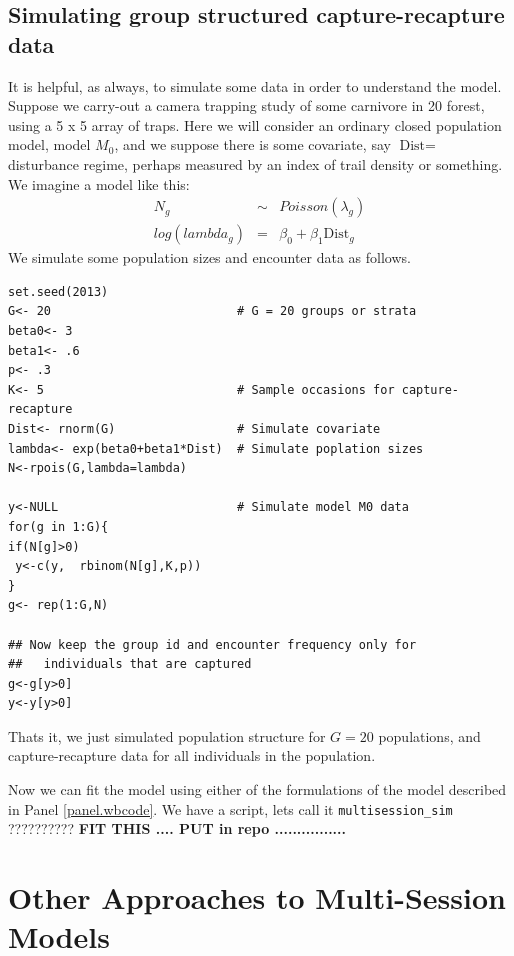 \subsection{
Simulating group structured 
capture-recapture data
}

It is helpful, as always, to simulate some data in order to understand
the model. Suppose we carry-out a camera trapping study of some
carnivore in 20 forest, using a 5 x 5 array of traps. Here we will
consider an ordinary closed population model, model $M_0$, and we
suppose there is 
some covariate, say $\mbox{Dist} = $ disturbance regime, perhaps measured by an
index of trail density or something.
We imagine a model like this:
\begin{eqnarray*}
N_{g} &\sim& Poisson(\lambda_{g})  \\
log(lambda_{g})& = &\beta_{0} + \beta_{1} \mbox{Dist}_{g} 
\end{eqnarray*}
We simulate some population sizes and encounter data  as
follows.
\begin{verbatim}
set.seed(2013)
G<- 20                          # G = 20 groups or strata
beta0<- 3
beta1<- .6
p<- .3
K<- 5                           # Sample occasions for capture-recapture
Dist<- rnorm(G)                 # Simulate covariate
lambda<- exp(beta0+beta1*Dist)  # Simulate poplation sizes 
N<-rpois(G,lambda=lambda)

y<-NULL                         # Simulate model M0 data
for(g in 1:G){
if(N[g]>0)
 y<-c(y,  rbinom(N[g],K,p))
}
g<- rep(1:G,N)

## Now keep the group id and encounter frequency only for
##   individuals that are captured 
g<-g[y>0]
y<-y[y>0]
\end{verbatim}
Thats it,
we just simulated population structure for $G=20$ populations, and
capture-recapture data for all individuals in the population. 

Now we can fit the model using either of the formulations 
of the model described in Panel \ref{panel.wbcode}.  We have a script,
lets call it \mbox{\tt multisession\_sim}
??????????
{\bf FIT THIS .... PUT in repo ................ }



\section{Other Approaches to Multi-Session Models}


